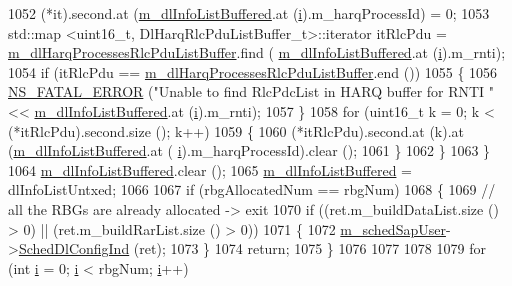 \begin{DoxyCode}
1052           (*it).second.at (\hyperlink{classns3_1_1PfFfMacScheduler_af3c266623addc28fc6ecd97901183a2f}{m\_dlInfoListBuffered}.at (\hyperlink{bernuolliDistribution_8m_a6f6ccfcf58b31cb6412107d9d5281426}{i}).m\_harqProcessId) = 0;
1053           std::map <uint16\_t, DlHarqRlcPduListBuffer\_t>::iterator itRlcPdu =  
      \hyperlink{classns3_1_1PfFfMacScheduler_acf9952b5bb3d26644b5e25054ca6e385}{m\_dlHarqProcessesRlcPduListBuffer}.find (
      \hyperlink{classns3_1_1PfFfMacScheduler_af3c266623addc28fc6ecd97901183a2f}{m\_dlInfoListBuffered}.at (\hyperlink{bernuolliDistribution_8m_a6f6ccfcf58b31cb6412107d9d5281426}{i}).m\_rnti);
1054           \textcolor{keywordflow}{if} (itRlcPdu == \hyperlink{classns3_1_1PfFfMacScheduler_acf9952b5bb3d26644b5e25054ca6e385}{m\_dlHarqProcessesRlcPduListBuffer}.end ())
1055             \{
1056               \hyperlink{group__fatal_ga5131d5e3f75d7d4cbfd706ac456fdc85}{NS\_FATAL\_ERROR} (\textcolor{stringliteral}{"Unable to find RlcPdcList in HARQ buffer for RNTI "} << 
      \hyperlink{classns3_1_1PfFfMacScheduler_af3c266623addc28fc6ecd97901183a2f}{m\_dlInfoListBuffered}.at (\hyperlink{bernuolliDistribution_8m_a6f6ccfcf58b31cb6412107d9d5281426}{i}).m\_rnti);
1057             \}
1058           \textcolor{keywordflow}{for} (uint16\_t k = 0; k < (*itRlcPdu).second.size (); k++)
1059             \{
1060               (*itRlcPdu).second.at (k).at (\hyperlink{classns3_1_1PfFfMacScheduler_af3c266623addc28fc6ecd97901183a2f}{m\_dlInfoListBuffered}.at (
      \hyperlink{bernuolliDistribution_8m_a6f6ccfcf58b31cb6412107d9d5281426}{i}).m\_harqProcessId).clear ();
1061             \}
1062         \}
1063     \}
1064   \hyperlink{classns3_1_1PfFfMacScheduler_af3c266623addc28fc6ecd97901183a2f}{m\_dlInfoListBuffered}.clear ();
1065   \hyperlink{classns3_1_1PfFfMacScheduler_af3c266623addc28fc6ecd97901183a2f}{m\_dlInfoListBuffered} = dlInfoListUntxed;
1066 
1067   \textcolor{keywordflow}{if} (rbgAllocatedNum == rbgNum)
1068     \{
1069       \textcolor{comment}{// all the RBGs are already allocated -> exit}
1070       \textcolor{keywordflow}{if} ((ret.m\_buildDataList.size () > 0) || (ret.m\_buildRarList.size () > 0))
1071         \{
1072           \hyperlink{classns3_1_1PfFfMacScheduler_a16d9c49b69668f9343e9e7409179b8ae}{m\_schedSapUser}->\hyperlink{classns3_1_1FfMacSchedSapUser_a28f8484af5a32a45ee6c0e51770d83f7}{SchedDlConfigInd} (ret);
1073         \}
1074       \textcolor{keywordflow}{return};
1075     \}
1076 
1077 
1078 
1079   \textcolor{keywordflow}{for} (\textcolor{keywordtype}{int} \hyperlink{bernuolliDistribution_8m_a6f6ccfcf58b31cb6412107d9d5281426}{i} = 0; \hyperlink{bernuolliDistribution_8m_a6f6ccfcf58b31cb6412107d9d5281426}{i} < rbgNum; \hyperlink{bernuolliDistribution_8m_a6f6ccfcf58b31cb6412107d9d5281426}{i}++)

\end{DoxyCode}
